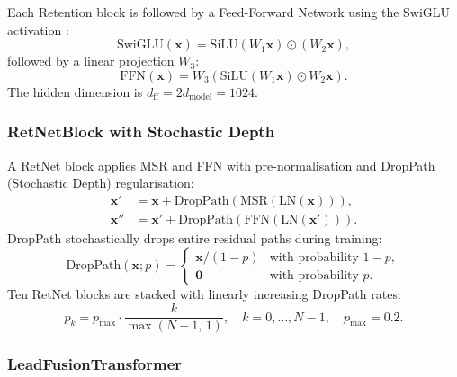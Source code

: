 Each Retention block is followed by a Feed-Forward Network using the
SwiGLU activation \cite{ref18}:
\begin{equation}
  \mathrm{SwiGLU}(\mathbf{x}) =
    \mathrm{SiLU}(W_1 \mathbf{x}) \odot (W_2 \mathbf{x}),
  \label{eq:swiglu}
\end{equation}
followed by a linear projection $W_3$:
\begin{equation}
  \mathrm{FFN}(\mathbf{x}) = W_3\!\left(
    \mathrm{SiLU}(W_1 \mathbf{x}) \odot W_2 \mathbf{x}
  \right).
  \label{eq:ffn}
\end{equation}
The hidden dimension is $d_{\mathrm{ff}} = 2d_{\mathrm{model}} = 1024$.

\subsubsection{RetNetBlock with Stochastic Depth}

A RetNet block applies MSR and FFN with pre-normalisation and
DropPath (Stochastic Depth) regularisation:
\begin{align}
  \mathbf{x}' &= \mathbf{x} + \mathrm{DropPath}\!\left(
    \mathrm{MSR}(\mathrm{LN}(\mathbf{x}))
  \right), \label{eq:retblock1} \\
  \mathbf{x}'' &= \mathbf{x}' + \mathrm{DropPath}\!\left(
    \mathrm{FFN}(\mathrm{LN}(\mathbf{x}'))
  \right). \label{eq:retblock2}
\end{align}
DropPath stochastically drops entire residual paths during training:
\begin{equation}
  \mathrm{DropPath}(\mathbf{x}; p) =
  \begin{cases}
    \mathbf{x} / (1-p) & \text{with probability } 1-p, \\
    \mathbf{0}          & \text{with probability } p.
  \end{cases}
  \label{eq:droppath}
\end{equation}
Ten RetNet blocks are stacked with linearly increasing DropPath rates:
\begin{equation}
  p_k = p_{\max} \cdot \frac{k}{\max(N-1,\,1)},
  \quad k = 0, \ldots, N-1,\quad p_{\max} = 0.2.
  \label{eq:droppath_schedule}
\end{equation}

\subsubsection{LeadFusionTransformer}

